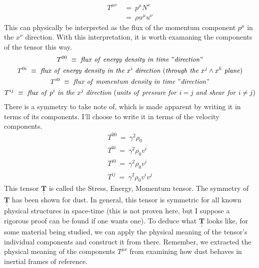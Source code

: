 \begin{equation}
  \begin{aligned}
    T^{\mu\nu}\ &=\ p^{\mu}N^{\nu}\\
    &=\ \rho u^{\mu}u^{\nu}
  \end{aligned}
\end{equation}
This can physically be interpreted as the flux of the momentum component $p^{\mu}$ in the $x^{\nu}$ direction.  With
this interpretation, it is worth examaning the components of the tensor this way.
\begin{gather}
  T^{00}\ \equiv\ \mathit{flux\ of\ energy\ density\ in\ time\ "direction"} \\
  T^{0i}\ \equiv\ \mathit{flux\ of\ energy\ density\ in\ the}\ x^i\ \mathit{direction}\
  (\mathit{through\ the}\ x^j\wedge x^k\ \mathit{plane}) \\
  T^{i0}\ \equiv\ \mathit{flux\ of\ momentum\ density\ in\ time\ "direction"} \\
  T^{ij}\ \equiv\ \mathit{flux\ of}\ p^i\ \mathit{in\ the}\ x^j\ \mathit{direction}\ 
  (\mathit{units\ of\ pressure\ for}\ i=j\ \mathit{and\ shear\ for}\ i\neq j)
\end{gather}
There is a symmetry to take note of, which is made apparent by writing it in terms of its components.  I'll choose to
write it in terms of the velocity components.
\begin{gather}
  T^{00}\ =\ \gamma^2\rho_0 \\
  T^{0i}\ =\ \gamma^2\rho_0v^i \\
  T^{i0}\ =\ \gamma^2\rho_0v^i \\
  T^{ij}\ =\ \gamma^2\rho_0v^iv^j
\end{gather}
This tensor $\underline{\underline{\mathbf{T}}}$ is called the Stress, Energy, Momentum tensor.  
The symmetry of $\underline{\underline{\mathbf{T}}}$ has been shown for dust.  In general, this tensor is
symmetric for all known physical structures in space-time (this is not proven here, but I suppose a rigorous
proof can be found if one wants one).  To deduce what $\underline{\underline{\mathbf{T}}}$ looks like, for some material
being studied, we can apply the physical meaning of the tensor's individual components and construct it from there.  Remember,
we extracted the physical meaning of the components $T^{\mu\nu}$ from examining how dust behaves in inertial frames of
reference.

